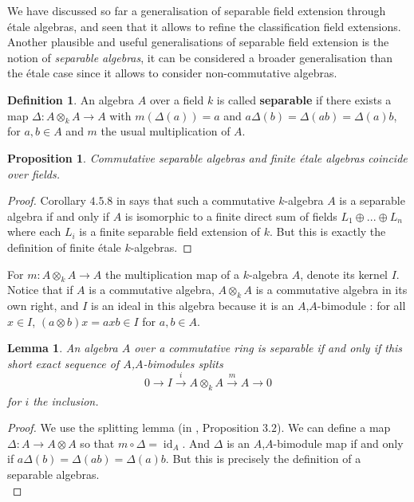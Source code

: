 \documentclass{article}
\theoremstyle{plain}
\newtheorem{proposition}[theorem]{Proposition}
\newtheorem{lemma}[theorem]{Lemma}
\theoremstyle{definition}
\newtheorem{definition}[theorem]{Definition}
\DeclareMathOperator{\id}{id}
\begin{document}
\noindent We have discussed so far a generalisation of separable field extension through \'etale algebras, and seen that it allows to refine the classification field extensions. 
Another plausible and useful generalisations of separable field extension is the notion of \textit{separable algebras}, it can be considered a broader generalisation than the \'etale case since it allows to consider non-commutative algebras.

\begin{definition}
    An algebra $A$ over a field $k$ is called \textbf{separable} if there exists a map $\Delta : A\otimes_k A\rightarrow A$ with $m(\Delta(a))=a$ and $a\Delta(b) = \Delta(ab) = \Delta(a)b$, for $a,b\in A$ and $m$ the usual multiplication of $A$.
\end{definition}

\begin{proposition}
\label{commut_separable_is_etale}
    Commutative separable algebras  and finite \'etale algebras coincide over fields.
\end{proposition}
\begin{proof}
    Corollary $4.5.8$ in \cite{Sep_al} says that such a commutative $k$-algebra $A$ is a separable algebra if and only if $A$ is isomorphic to a finite direct sum of fields $L_1 \oplus ... \oplus L_n$ where each $L_i$ is a finite separable field extension of $k$.
    But this is exactly the definition of finite \'etale $k$-algebras.
\end{proof}


\noindent For $m:A\otimes_k A \rightarrow A$ the multiplication map of a $k$-algebra $A$, denote its kernel $I$.
Notice that if $A$ is a commutative algebra, $A\otimes_kA$ is a commutative algebra in its own right, and $I$ is an ideal in this algebra because it is an $A$,$A$-bimodule : for all $x\in I$, $(a\otimes b)x = axb \in I$ for $a,b\in A$.

\begin{lemma}
\label{lemma_splitting_exact_sequence_separable}
    An algebra $A$ over a commutative ring is separable if and only if this short exact sequence of $A$,$A$-bimodules splits
    $$0\xrightarrow[]{} I \xrightarrow[]{i} A\otimes_kA \xrightarrow[]{m} A\rightarrow 0$$
    for $i$ the inclusion.
\end{lemma}
\begin{proof}
    We use the splitting lemma (in \cite{Lang_algebra}, Proposition $3.2$).
    We can define a map $\Delta: A\rightarrow A\otimes A$ so that $m\circ \Delta = \id_A$. 
    And  $\Delta$ is an $A$,$A$-bimodule map if and only if $a\Delta(b) = \Delta(ab)= \Delta(a)b$. 
    But this is precisely the definition of a separable algebras. \\
\end{proof}
\end{document}
